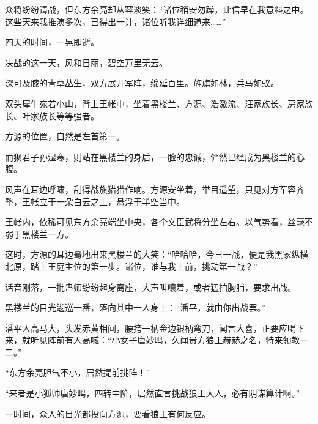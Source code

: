 \begin{this_body}
众将纷纷请战，但东方余亮却从容淡笑：“诸位稍安勿躁，此信早在我意料之中。这些天来我推演多次，已得出一计，诸位听我详细道来……”

四天的时间，一晃即逝。

决战的这一天，风和日丽，碧空万里无云。

深可及膝的青草丛生，双方展开军阵，绵延百里。旌旗如林，兵马如蚁。

双头犀牛宛若小山，背上王帐中，坐着黑楼兰、方源、浩激流、汪家族长、房家族长、叶家族长等等强者。

方源的位置，自然是左首第一。

而狈君子孙湿寒，则站在黑楼兰的身后，一脸的忠诚，俨然已经成为黑楼兰的心腹。

风声在耳边呼啸，刮得战旗猎猎作响。方源安坐着，举目遥望，只见对方军容齐整，王帐立于一朵白云之上，悬浮于半空当中。

王帐内，依稀可见东方余亮端坐中央，各个文臣武将分坐左右。以气势看，丝毫不弱于黑楼兰一方。

这时，方源的耳边蓦地出来黑楼兰的大笑：“哈哈哈，今日一战，便是我黑家纵横北原，踏上王庭主位的第一步。诸位，谁与我上前，挑动第一战？”

话音刚落，一批蛊师纷纷起身离座，大声叫嚷着，或者猛拍胸脯，要求出战。

黑楼兰的目光逡巡一番，落向其中一人身上：“潘平，就由你出战罢。”

潘平人高马大，头发赤黄相间，腰挎一柄金边银柄弯刀，闻言大喜，正要应喝下来，就听见阵前有人高喊：“小女子唐妙鸣，久闻贵方狼王赫赫之名，特来领教一二。”

“东方余亮胆气不小，居然提前挑阵！”

“来者是小狐帅唐妙鸣，四转中阶，居然直言挑战狼王大人，必有阴谋算计啊。”

一时间，众人的目光都投向方源，要看狼王有何反应。

\end{this_body}

